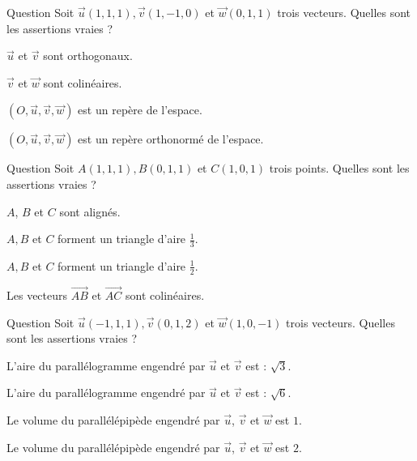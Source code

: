 

\begin{multi}[multiple,feedback=
{Deux vecteurs \(\vec{u}\) et \(\vec{v}\) sont orthogonaux si et seulement si \( \vec{u} \cdot \vec{v}=0\).
\((O,\vec{u},\vec{v},\vec{w})\) est un repère si et seulement si \(\det (\vec{u},\vec{v},\vec{w}) \neq 0\).
}]{Question}
Soit \(\vec{u}(1,1,1), \vec{v}(1,-1,0)\) et \(\vec{w}(0,1,1)\) trois vecteurs. Quelles sont les assertions vraies ?

    \item* \(\vec{u}\) et \(\vec{v}\) sont orthogonaux.
    \item \(\vec{v}\) et \(\vec{w}\) sont colinéaires.
    \item* \((O,\vec{u},\vec{v},\vec{w})\) est un repère de l'espace.
    \item \((O,\vec{u},\vec{v},\vec{w})\) est un repère orthonormé de l'espace.
\end{multi}


\begin{multi}[multiple,feedback=
{L'aire du triangle \(ABC\) est donnée par : \(\frac{1}{2} \Vert \overrightarrow{AB} \wedge \overrightarrow{AC} \Vert\). 
}]{Question}
Soit \(A(1,1,1), B(0,1,1)\) et \(C(1,0,1)\) trois points. Quelles sont les assertions vraies ?

    \item \(A\), \(B\) et \(C\) sont alignés.
    \item \(A,B\) et \(C\) forment un triangle d'aire \(\frac{1}{3}\).
    \item* \(A,B\) et \(C\) forment un triangle d'aire \(\frac{1}{2}\).
    \item Les vecteurs \(\overrightarrow{AB}\) et  \(\overrightarrow{AC}\) sont colinéaires.
\end{multi}


\begin{multi}[multiple,feedback=
{L'aire du parallélogramme engendré par deux vecteurs \(\vec{u}\) et \(\vec{v}\) est donnée par : \( \Vert \vec{u} \wedge \vec{v} \Vert\).
Le volume du parallélépipède engendré par trois vecteurs \(\vec{u}\), \(\vec{v}\) et  \(\vec{w}\) est donné par : \(|\det (\vec{u}, \vec{v},\vec{w})|\).
}]{Question}
Soit \(\vec{u}(-1,1,1), \vec{v}(0,1,2)\) et \(\vec{w}(1,0,-1)\) trois vecteurs. Quelles sont les assertions vraies ?

    \item L'aire du parallélogramme engendré par \(\vec{u}\) et  \(\vec{v}\) est : \(\sqrt 3\).
    \item* L'aire du parallélogramme engendré par \(\vec{u}\) et  \(\vec{v}\) est : \( \sqrt 6\).
    \item Le volume du parallélépipède engendré par \(\vec{u}\), \(\vec{v}\) et  \(\vec{w}\) est \(1\).
    \item* Le volume du parallélépipède engendré par \(\vec{u}\), \(\vec{v}\) et  \(\vec{w}\) est \(2\).
\end{multi}



